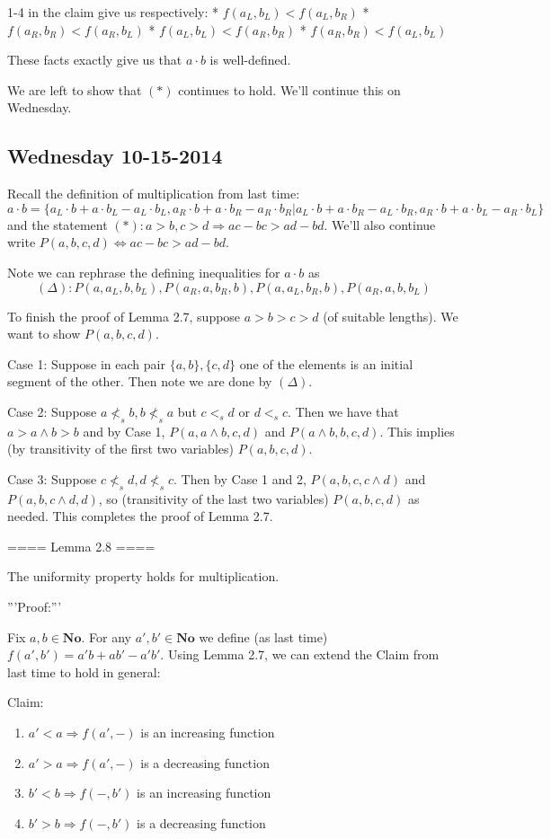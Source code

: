 1-4 in the claim give us respectively:
* $f(a_L, b_L) < f(a_L, b_R)$
* $f(a_R, b_R) < f(a_R, b_L)$
* $f(a_L, b_L) < f(a_R, b_R)$
* $f(a_R, b_R) < f(a_L, b_L)$

These facts exactly give us that $a\cdot b$ is well-defined.

We are left to show that $(*)$ continues to hold. We'll continue this on Wednesday.

\subsection{ Wednesday 10-15-2014 }

Recall the definition of multiplication from last time:
\[
a\cdot b = \{a_L\cdot b + a\cdot b_L - a_L\cdot b_L, a_R\cdot b + a\cdot b_R - a_R\cdot b_R | a_L\cdot b + a\cdot b_R - a_L\cdot b_R, a_R\cdot b + a\cdot b_L - a_R\cdot b_L \}
\]
and the statement $(*): a>b, c>d \Rightarrow ac-bc > ad-bd$. We'll also continue write $P(a,b,c,d)\Leftrightarrow ac - bc > ad - bd$.

Note we can rephrase the defining inequalities for $a\cdot b$ as
\[
(\Delta): P(a,a_L,b,b_L), P(a_R,a,b_R,b), P(a,a_L,b_R,b), P(a_R,a,b,b_L)
\]

To finish the proof of Lemma 2.7, suppose $a>b>c>d$ (of suitable lengths). We want to show $P(a,b,c,d)$.

Case 1:  Suppose in each pair $\{a,b\}, \{c,d\}$ one of the elements is an initial segment of the other. Then note we are done by $(\Delta)$.

Case 2:  Suppose $a \not<_s b, b\not<_s a$ but $c <_s d$ or $d <_s c$. Then we have that $a > a\wedge b > b$ and by Case 1, $P(a,a\wedge b, c, d)$ and $P(a\wedge b, b, c, d)$. This implies (by transitivity of the first two variables) $P(a,b,c,d)$.

Case 3:  Suppose $c \not<_s d, d\not<_s c$. Then by Case 1 and 2, $P(a,b,c,c\wedge d)$ and $P(a,b,c\wedge d, d)$, so (transitivity of the last two variables) $P(a,b,c,d)$ as needed. This completes the proof of Lemma 2.7.

==== Lemma 2.8 ====

The uniformity property holds for multiplication.

'''Proof:'''

Fix $a,b\in \mathbf{No}$. For any $a',b'\in \mathbf{No}$ we define (as last time) $f(a',b') = a'b + ab' - a'b'$. Using Lemma 2.7, we can extend the Claim from last time to hold in general:

Claim:
\begin{enumerate}
\item $a' < a \Rightarrow f(a',-)$ is an increasing function
\item $a' > a \Rightarrow f(a',-)$ is a decreasing function
\item $b' < b \Rightarrow f(-,b')$ is an increasing function
\item $b' > b \Rightarrow f(-,b')$ is a decreasing function
\end{enumerate}

